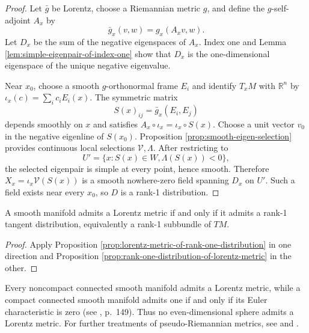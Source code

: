 \begin{proof}

\sketch Let $\bar g$ be Lorentz, choose a Riemannian metric $g$, and define the
$g$-self-adjoint $A_x$ by
\[
\bar g_x(v,w)=g_x(A_xv,w).
\]
Let $D_x$ be the sum of the negative eigenspaces of $A_x$. Index one and Lemma
\ref{lem:simple-eigenpair-of-index-one} show that $D_x$ is the one-dimensional
eigenspace of the unique negative eigenvalue.

Near $x_0$, choose a smooth $g$-orthonormal frame $E_i$ and identify $T_xM$ with
$\mathbb R^n$ by $\iota_x(c)=\sum_i c_iE_i(x)$. The symmetric matrix
\[
S(x)_{ij}=\bar g_x(E_i,E_j)
\]
depends smoothly on $x$ and satisfies
$A_x\circ\iota_x=\iota_x\circ S(x)$. Choose a unit vector $v_0$ in the negative
eigenline of $S(x_0)$. Proposition \ref{prop:smooth-eigen-selection} provides
continuous local selections $\mathcal V,\Lambda$. After restricting to
\[
U'=\{x:S(x)\in W, \Lambda(S(x))<0\},
\]
the selected eigenpair is simple at every point, hence smooth. Therefore
$X_x=\iota_x\mathcal V(S(x))$ is a smooth nowhere-zero field spanning $D_x$ on
$U'$. Such a field exists near every $x_0$, so $D$ is a rank-1 distribution.
\end{proof}

\begin{theorem}
\label{thm:lorentz-metrics}





A smooth manifold admits a Lorentz metric if and only if it admits a rank-1
tangent distribution, equivalently a rank-1 subbundle of $TM$.
\end{theorem}

\begin{proof}

\sketch Apply Proposition \ref{prop:lorentz-metric-of-rank-one-distribution} in one
direction and Proposition \ref{prop:rank-one-distribution-of-lorentz-metric} in
the other.
\end{proof}

Every noncompact connected smooth manifold admits a Lorentz metric, while a compact connected smooth
manifold admits one if and only if its Euler characteristic is zero (see \cite{ON83}, p.~149). Thus no
even-dimensional sphere admits a Lorentz metric. For further treatments of pseudo-Riemannian metrics,
see \cite{ON83} and \cite{HE73}.
